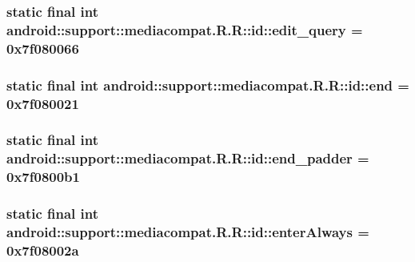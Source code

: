 \hypertarget{classandroid_1_1support_1_1mediacompat_1_1_r_1_1id_edc859a50b01d4ac00827adf9ceb48ff}{
\subsubsection[{edit\_\-query}]{\setlength{\rightskip}{0pt plus 5cm}static final int android::support::mediacompat.R.R::id::edit\_\-query = 0x7f080066}}
\label{classandroid_1_1support_1_1mediacompat_1_1_r_1_1id_edc859a50b01d4ac00827adf9ceb48ff}


\hypertarget{classandroid_1_1support_1_1mediacompat_1_1_r_1_1id_7c6a1c69988a3b265e9b5a0330e74a78}{
\subsubsection[{end}]{\setlength{\rightskip}{0pt plus 5cm}static final int android::support::mediacompat.R.R::id::end = 0x7f080021}}
\label{classandroid_1_1support_1_1mediacompat_1_1_r_1_1id_7c6a1c69988a3b265e9b5a0330e74a78}


\hypertarget{classandroid_1_1support_1_1mediacompat_1_1_r_1_1id_325d9359805748d2462bc28e8726a2f9}{
\subsubsection[{end\_\-padder}]{\setlength{\rightskip}{0pt plus 5cm}static final int android::support::mediacompat.R.R::id::end\_\-padder = 0x7f0800b1}}
\label{classandroid_1_1support_1_1mediacompat_1_1_r_1_1id_325d9359805748d2462bc28e8726a2f9}


\hypertarget{classandroid_1_1support_1_1mediacompat_1_1_r_1_1id_4fc69a9b149b2782e560b078e08f91ac}{
\subsubsection[{enterAlways}]{\setlength{\rightskip}{0pt plus 5cm}static final int android::support::mediacompat.R.R::id::enterAlways = 0x7f08002a}}
\label{classandroid_1_1support_1_1mediacompat_1_1_r_1_1id_4fc69a9b149b2782e560b078e08f91ac}


